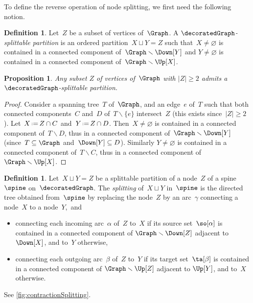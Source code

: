 \documentclass{amsart}
\newtheorem{proposition}[theorem]{Proposition}
\theoremstyle{definition}
\newtheorem{definition}[theorem]{Definition}
\newcommand{\ssm}{\smallsetminus} %
\newcommand{\eqdef}{\mbox{\,\raisebox{0.2ex}{\scriptsize\ensuremath{\mathrm:}}\ensuremath{=}\,}} %
\newcommand{\darkblue}{\color{darkblue}} %
\newcommand{\defn}[1]{\textsl{\darkblue #1}} %
\begin{document}
To define the reverse operation of node splitting, we first need the following notion.

\begin{definition}
  \label{def:splittable}
  Let~$Z$ be a subset of vertices of~$\Graph$.
  A \defn{$\decoratedGraph$-splittable partition} is an ordered partition~$X \sqcup Y = Z$ such that~$X \ne \varnothing$ is contained in a connected component of~$\Graph \ssm \Down[Y]$ and $Y \ne \varnothing$ is contained in a connected component of~$\Graph \ssm \Up[X]$.
\end{definition}

\begin{proposition}
  \label{prop:splittablePartitions}
  Any subset $Z$ of vertices of~$\Graph$ with $|Z| \ge 2$ admits a $\decoratedGraph$-splittable partition.
\end{proposition}

\begin{proof} 
  Consider a spanning tree~$T$ of~$\Graph$, and an edge~$e$ of~$T$ such that both connected components~$C$ and~$D$ of~$T \ssm \{e\}$ intersect~$Z$ (this exists since~$|Z| \ge 2$).
  Let~$X \eqdef Z \cap C$ and~$Y \eqdef Z \cap D$.
  Then~$X \ne \varnothing$ is contained in a connected component of~$T \ssm D$, thus in a connected component of~$\Graph \ssm \Down[Y]$ (since~$T \subseteq \Graph$ and~$\Down[Y] \subseteq D$).
  Similarly $Y \ne \varnothing$ is contained in a connected component of~$T \ssm C$, thus in a connected component of~$\Graph \ssm \Up[X]$.
\end{proof}

\begin{definition}
  \label{def:nodeSplitting} 
  Let~$X \sqcup Y = Z$ be a splittable partition of a node~$Z$ of a spine~$\spine$ on~$\decoratedGraph$.
  The \defn{splitting} of~$X \sqcup Y$ in~$\spine$ is the directed tree obtained from~$\spine$ by replacing the node~$Z$ by an arc~$\gamma$ connecting a node~$X$ to a node~$Y$,~and
  \begin{itemize}
    \item connecting each incoming arc~$\alpha$ of~$Z$ to~$X$ if its source set~$\so[\alpha]$ is contained in a connected component of $\Graph \ssm \Down[Z]$ adjacent to $\Down[X]$, and to~$Y$ otherwise, 
    \item connecting each outgoing arc~$\beta$ of~$Z$ to~$Y$ if its target set~$\ta[\beta]$ is contained in a connected component of $\Graph \ssm \Up[Z]$ adjacent to $\Up[Y]$, and to~$X$ otherwise.
  \end{itemize}
  See \cref{fig:contractionSplitting}.
\end{definition}
\end{document}
